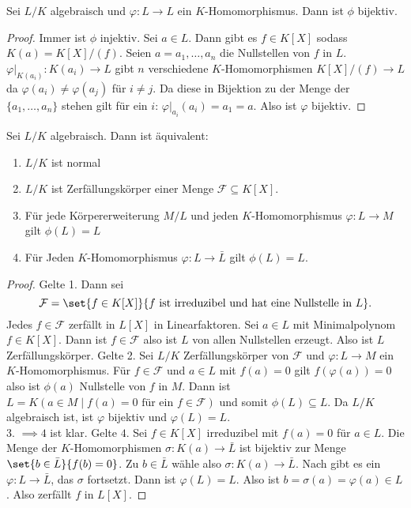 \begin{Lemma}
    Sei \(L/K\) algebraisch und \(\varphi\colon L\to L\) ein \(K\)-Homomorphismus. Dann ist \(\phi\) bijektiv.
\end{Lemma}
\begin{proof}
    Immer ist \(\phi\) injektiv.
    Sei \(a\in L\). Dann gibt es \(f\in K[X]\) sodass \(K(a)=K[X]/(f)\). Seien \(a=a_1,\dots,a_n\) die Nullstellen von \(f\) in \(L\).
    \(\varphi|_{K(a_i)}\colon K(a_i)\to L\) gibt \(n\) verschiedene \(K\)-Homomorphismen \(K[X]/(f)\to L\) da \(\varphi(a_i)\neq \varphi(a_j)\) für \(i\neq j\). Da diese in Bijektion zu der Menge der \(\{a_1,\dots,a_n\}\) stehen gilt für ein \(i\): \(\varphi|_{a_i}(a_i)=a_1=a\). Also ist \(\varphi\) bijektiv.
\end{proof}
\begin{Satz}
    Sei \(L/K\) algebraisch. Dann ist äquivalent:
    \begin{enumerate}
        \item \(L/K\) ist normal
        \item \(L/K\) ist Zerfällungskörper einer Menge \(\mathcal F\subseteq K[X]\).
        \item Für jede Körpererweiterung \(M/L\) und jeden \(K\)-Homomorphismus \(\varphi\colon L\to M\) gilt \(\phi(L)=L\)
        \item Für Jeden \(K\)-Homomorphismus \(\varphi\colon L\to\bar L\) gilt \(\phi(L)=L\).
    \end{enumerate}
\end{Satz}
\begin{proof}
    Gelte 1. Dann sei \[\mathcal F=\set{f\in K[X]}{ f\text{ ist irreduzibel und hat eine Nullstelle in \(L\)}}.\]
    Jedes \(f\in \mathcal F\) zerfällt in \(L[X]\) in Linearfaktoren.
    Sei \(a\in L\) mit Minimalpolynom \(f\in K[X]\). Dann ist \(f\in\mathcal F\) also ist \(L\) von allen Nullstellen erzeugt. Also ist \(L\) Zerfällungskörper.
    Gelte 2. Sei \(L/K\) Zerfällungskörper von \(\mathcal F\) und \(\varphi\colon L\to M\) ein \(K\)-Homomorphismus. Für \(f\in \mathcal F\) und \(a\in L\) mit \(f(a)=0\) gilt \(f(\varphi(a))=0\) also ist \(\phi(a)\) Nullstelle von \(f\) in \(M\).
    Dann ist \(L=K(a\in M\mid f(a)=0 \text{ für ein } f\in\mathcal F)\) und somit \(\phi(L)\subseteq L\). Da \(L/K\) algebraisch ist, ist \(\varphi\) bijektiv und \(\varphi(L)=L.\)\\
    3. \(\implies 4\) ist klar. Gelte \(4.\) Sei \(f\in K[X]\) irreduzibel mit \(f(a)=0\) für \(a\in L\).
    Die Menge der \(K\)-Homomorphismen \(\sigma\colon K(a)\to \bar L\) ist bijektiv zur Menge \(\set{b\in\bar L}{ f(b)=0}\). Zu \(b\in \bar L\) wähle also \(\sigma\colon K(a)\to \bar L\).
    Nach  gibt es ein \(\varphi\colon L\to \bar L\), das \(\sigma\) fortsetzt. Dann ist \(\varphi(L)=L\). Also ist \(b=\sigma(a)=\varphi(a)\in L\). Also zerfällt \(f\) in \(L[X]\).
\end{proof}
